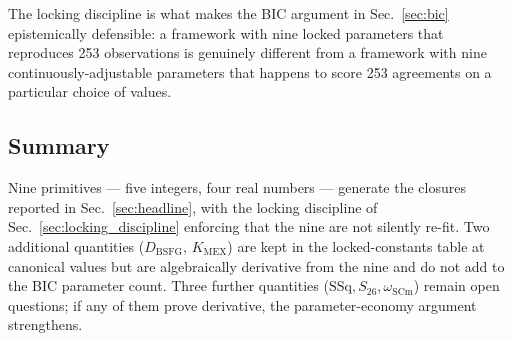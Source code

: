 The locking discipline is what makes the BIC argument in
Sec.~\ref{sec:bic} epistemically defensible: a framework with nine
locked parameters that reproduces 253 observations is genuinely
different from a framework with nine continuously-adjustable
parameters that happens to score 253 agreements on a particular
choice of values.

\subsection{Summary}

Nine primitives --- five integers, four real numbers --- generate
the closures reported in Sec.~\ref{sec:headline}, with the locking
discipline of Sec.~\ref{sec:locking_discipline} enforcing that the
nine are not silently re-fit. Two additional quantities
($D_{\text{BSFG}}$, $K_{\text{MEX}}$) are kept in the
locked-constants table at canonical values but are algebraically
derivative from the nine and do not add to the BIC parameter count.
Three further quantities ($\mathrm{SSq}, S_{26}, \omega_{\text{SCm}}$)
remain open questions; if any of them prove derivative, the
parameter-economy argument strengthens.

